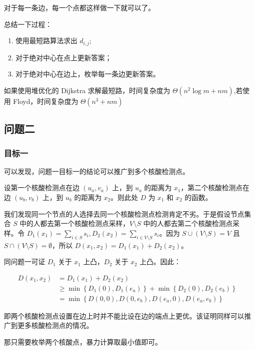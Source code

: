 \documentclass{cumcmthesis}
\begin{document}
对于每一条边，每一个点都这样做一下就可以了。

总结一下过程：

\begin{enumerate}
    \item 使用最短路算法求出 $d_{i,j}$;
    \item 对于绝对中心在点上更新答案；
    \item 对于绝对中心在边上，枚举每一条边更新答案。
\end{enumerate}

如果使用堆优化的 Dijkstra 求解最短路，时间复杂度为 $\Theta(n^2\log m + nm)$,若使用 Floyd，时间复杂度为 $\Theta(n^3 + nm)$

\subsection{问题二}

\subsubsection{目标一}

可以发现，问题一目标一的结论可以推广到多个核酸检测点。

设第一个核酸检测点在边 $(u_a,v_a)$ 上，到 $u_a$ 的距离为 $x_1$，第二个核酸检测点在边 $(u_b,v_b)$ 上，到 $u_b$ 的距离为 $x_2$。则此处 $D$ 为 $x_1$ 和 $x_2$ 的函数。

我们发现同一个节点的人选择去同一个核酸检测点检测肯定不劣。于是假设节点集合 $S$ 中的人都去第一个核酸检测点采样，$V\setminus S$ 中的人都去第二个核酸检测点采样。令 $D_1(x_1)=\sum_{i\in S}s_i,D_2(x_2)=\sum_{i\in V\setminus S}s_i$。因为 $S\cup (V\setminus S)=V$ 且 $S\cap (V\setminus S)=\emptyset$，所以 $D(x_1,x_2)=D_1(x_1)+D_2(x_2)$。

同问题一可证 $D_1$ 关于 $x_1$ 上凸，$D_2$ 关于 $x_2$ 上凸。因此：

\begin{align*}
    D(x_1,x_2)&=D_1(x_1)+D_2(x_2)\\
    &\ge \min\left\{D_1(0),D_1(e_a)\right\}+\min\left\{D_2(0),D_2(e_b)\right\}\\
    &=\min\left\{D(0,0),D(0,e_b),D(e_a,0),D(e_a,e_b)\right\}
\end{align*}\par

即两个核酸检测点设置在边上时并不能比设在边的端点上更优。该证明同样可以推广到更多核酸检测点的情况。

那只需要枚举两个核酸点，暴力计算取最小值即可。
\end{document}
